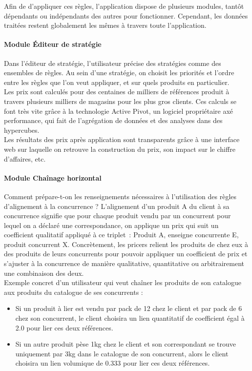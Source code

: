 \documentclass{rapportCS}
\begin{document}
Afin de d'appliquer ces règles, l'application dispose de plusieurs modules, tantôt dépendants 
ou indépendants des autres pour fonctionner.
Cependant, les données traitées restent globalement les mêmes à travers toute l'application.

\paragraph{Module Éditeur de stratégie}
Dans l'éditeur de stratégie, l'utilisateur précise des stratégies comme des ensembles de règles.
Au sein d'une stratégie, on choisit les priorités et l'ordre entre les règles que l'on veut appliquer,
et sur quels produits en particulier.\\
Les prix sont calculés pour des centaines de milliers de références produit à travers plusieurs milliers
de magasins pour les plus gros clients. Ces calculs se font très vite grâce à la technologie
Active Pivot, un logiciel propriétaire axé performance, qui fait de l'agrégation de données et
des analyses dans des hypercubes.\\
Les résultats des prix après application sont transparents grâce à une interface web sur 
laquelle on retrouve la construction du prix, son impact sur le chiffre d'affaires, etc.

\paragraph{Module Chaînage horizontal}
Comment prépare-t-on les renseignements nécessaires à l'utilisation des règles d'alignement à la concurrence ?
L'alignement d'un produit A du client à sa concurrence signifie que pour chaque produit vendu par un
concurrent pour lequel on a déclaré une correspondance, on applique un prix qui suit un coefficient
qualitatif appliqué à ce triplet : Produit A, enseigne concurrente E, produit concurrent X.
Concrètement, les pricers relient les produits de chez eux à des produits de leurs concurrents 
pour pouvoir appliquer un coefficient de prix et s'ajuster à la concurrence de manière qualitative,
quantitative ou arbitrairement une combinaison des deux. \\
Exemple concret d'un utilisateur qui veut chaîner les produits de son catalogue aux produits du catalogue de
ses concurrents :\\
\begin{itemize}
  \item Si un produit à lier est vendu par pack de 12 chez le client et par pack de 6 chez son concurrent, le client
choisira un lien quantitatif de coefficient égal à 2.0 pour lier ces deux références. \\
  \item Si un autre produit pèse 1kg chez le client et son correspondant se trouve uniquement par 3kg dans
le catalogue de son concurrent, alors le client choisira un lien volumique de 0.333 pour lier ces deux références. 
\end{itemize}
\end{document}
